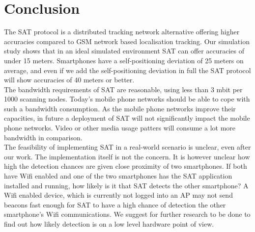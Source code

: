 \documentclass[10pt,titlepage]{article}
\begin{document}

\section{Conclusion}
The SAT protocol is a distributed tracking network alternative offering higher accuracies compared to GSM network based localisation tracking. Our simulation study shows that in an ideal simulated environment SAT can offer accuracies of under 15 meters. Smartphones have a self-positioning deviation of 25 meters on average, and even if we add the self-positioning deviation in full the SAT protocol will show accuracies of 40 meters or better.\\
The bandwidth requirements of SAT are reasonable, using less than 3 mbit per 1000 scanning nodes. Today's mobile phone networks should be able to cope with such a bandwidth consumption. As the mobile phone networks improve their capacities, in future a deployment of SAT will not significantly impact the mobile phone networks. Video or other media usage patters will consume a lot more bandwidth in comparison.\\
The feasibility of implementing SAT in a real-world scenario is unclear, even after our work. The implementation itself is not the concern. It is however unclear how high the detection chances are given close proximity of two smartphones. If both have Wifi enabled and one of the two smartphones has the SAT application installed and running, how likely is it that SAT detects the other smartphone? A Wifi enabled device, which is currently not logged into an AP may not send beacons fast enough for SAT to have a high chance of detection the other smartphone's Wifi communications. We suggest for further research to be done to find out how likely detection is on a low level hardware point of view.\\
\end{document}
